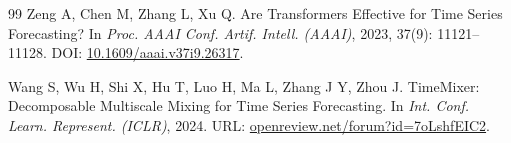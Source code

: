 \documentclass[12pt,a4paper]{ctexart}
\begin{document}
\begin{thebibliography}{99}
Zeng A, Chen M, Zhang L, Xu Q.
Are Transformers Effective for Time Series Forecasting?
In \textit{Proc. AAAI Conf. Artif. Intell. (AAAI)}, 2023, 37(9): 11121--11128.
DOI: \href{https://doi.org/10.1609/aaai.v37i9.26317}{10.1609/aaai.v37i9.26317}.

Wang S, Wu H, Shi X, Hu T, Luo H, Ma L, Zhang J Y, Zhou J.
TimeMixer: Decomposable Multiscale Mixing for Time Series Forecasting.
In \textit{Int. Conf. Learn. Represent. (ICLR)}, 2024.
URL: \href{https://openreview.net/forum?id=7oLshfEIC2}{openreview.net/forum?id=7oLshfEIC2}.

\end{thebibliography}
\end{document}
